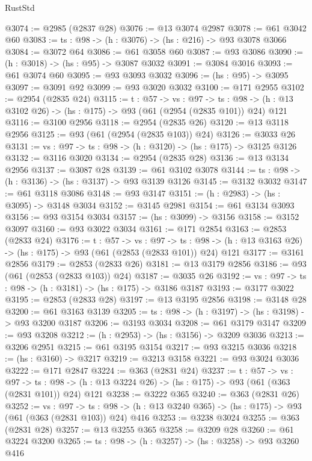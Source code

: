 \begin{lexlean}{RustStd}
\begin{coremodule}
@3074 := @2985 (@2837 @28)
@3076 := @13 @3074 @2987
@3078 := @61 @3042 @60
@3083 := {ts : @98} -> (h : @3076) -> (hs : @216) -> @93 @3078 @3066
@3084 := @3072 @64
@3086 := @61 @3058 @60
@3087 := @93 @3086
@3090 := (h : @3018) -> (hs : @95) -> @3087 @3032
@3091 := @3084 @3016
@3093 := @61 @3074 @60
@3095 := @93 @3093 @3032
@3096 := (hs : @95) -> @3095
@3097 := @3091 @92
@3099 := @93 @3020 @3032
@3100 := @171 @2955
@3102 := @2954 (@2835 @24)
@3115 := {t : @57} ->
  {vs : @97} ->
  {ts : @98} -> (h : @13 @3102 @26) -> (hs : @175) -> @93 (@61 (@2954 (@2835 @101)) @24) @121
@3116 := @3100 @2956
@3118 := @2954 (@2835 @26)
@3120 := @13 @3118 @2956
@3125 := @93 (@61 (@2954 (@2835 @103)) @24)
@3126 := @3033 @26
@3131 := {vs : @97} -> {ts : @98} -> (h : @3120) -> (hs : @175) -> @3125 @3126
@3132 := @3116 @3020
@3134 := @2954 (@2835 @28)
@3136 := @13 @3134 @2956
@3137 := @3087 @28
@3139 := @61 @3102 @3078
@3144 := {ts : @98} -> (h : @3136) -> (hs : @3137) -> @93 @3139 @3126
@3145 := @3132 @3032
@3147 := @61 @3118 @3086
@3148 := @93 @3147
@3151 := (h : @2983) -> (hs : @3095) -> @3148 @3034
@3152 := @3145 @2981
@3154 := @61 @3134 @3093
@3156 := @93 @3154 @3034
@3157 := (hs : @3099) -> @3156
@3158 := @3152 @3097
@3160 := @93 @3022 @3034
@3161 := @171 @2854
@3163 := @2853 (@2833 @24)
@3176 := {t : @57} ->
  {vs : @97} ->
  {ts : @98} -> (h : @13 @3163 @26) -> (hs : @175) -> @93 (@61 (@2853 (@2833 @101)) @24) @121
@3177 := @3161 @2856
@3179 := @2853 (@2833 @26)
@3181 := @13 @3179 @2856
@3186 := @93 (@61 (@2853 (@2833 @103)) @24)
@3187 := @3035 @26
@3192 := {vs : @97} -> {ts : @98} -> (h : @3181) -> (hs : @175) -> @3186 @3187
@3193 := @3177 @3022
@3195 := @2853 (@2833 @28)
@3197 := @13 @3195 @2856
@3198 := @3148 @28
@3200 := @61 @3163 @3139
@3205 := {ts : @98} -> (h : @3197) -> (hs : @3198) -> @93 @3200 @3187
@3206 := @3193 @3034
@3208 := @61 @3179 @3147
@3209 := @93 @3208
@3212 := (h : @2953) -> (hs : @3156) -> @3209 @3036
@3213 := @3206 @2951
@3215 := @61 @3195 @3154
@3217 := @93 @3215 @3036
@3218 := (hs : @3160) -> @3217
@3219 := @3213 @3158
@3221 := @93 @3024 @3036
@3222 := @171 @2847
@3224 := @363 (@2831 @24)
@3237 := {t : @57} ->
  {vs : @97} ->
  {ts : @98} -> (h : @13 @3224 @26) -> (hs : @175) -> @93 (@61 (@363 (@2831 @101)) @24) @121
@3238 := @3222 @365
@3240 := @363 (@2831 @26)
@3252 := {vs : @97} ->
  {ts : @98} -> (h : @13 @3240 @365) -> (hs : @175) -> @93 (@61 (@363 (@2831 @103)) @24) @416
@3253 := @3238 @3024
@3255 := @363 (@2831 @28)
@3257 := @13 @3255 @365
@3258 := @3209 @28
@3260 := @61 @3224 @3200
@3265 := {ts : @98} -> (h : @3257) -> (hs : @3258) -> @93 @3260 @416

\end{coremodule}
\end{lexlean}
